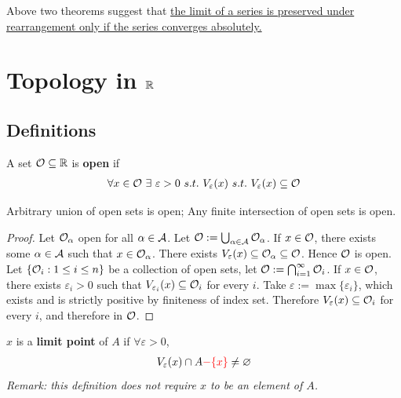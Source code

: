 \documentclass[11pt]{article}
\begin{document}
	\begin{remark}
		Above two theorems suggest that \ul{the limit of a series is preserved under rearrangement only if the series converges absolutely.}
	\end{remark}
	
	\section{Topology in $\mathbb{R}$}
	\subsection{Definitions}
	\begin{definition}
		A set $\mathcal{{O}} \subseteq \mathbb{R}$ is \textbf{open} if
		\begin{align}
			\forall x \in \mc{O}\ \exists\ \varepsilon > 0\ s.t.\ V_\varepsilon(x)\ s.t.\ V_\varepsilon(x) \subseteq \mc{O}
		\end{align}
	\end{definition}
	
	\begin{theorem}
		Arbitrary union of open sets is open; Any finite intersection of open sets is open.
	\end{theorem}
	
	\begin{proof}
		Let $\mathcal{{O}}_\alpha$ open for all $\alpha \in \mathcal{{A}}$. Let $\mathcal{{O}} := \bigcup_{\alpha \in \mathcal{{A}}} \mathcal{{O}}_\alpha$. If $x \in \mathcal{{O}}$, there exists some $\alpha \in \mathcal{{A}}$ such that $x \in \mathcal{{O}}_\alpha$. There exists $V_\varepsilon(x) \subseteq \mathcal{{O}}_{\alpha} \subseteq \mathcal{{O}}$. Hence $\mathcal{{O}}$ is open.
		\\
		Let $\{\mathcal{{O}}_i: 1 \leq i \leq n\}$ be a collection of open sets, let $\mathcal{{O}} := \bigcap_{i=1}^\infty \mathcal{{O}}_i$. If $x \in \mathcal{{O}}$, there exists $\varepsilon_i > 0$ such that $V_{\varepsilon_i}(x) \subseteq \mathcal{{O}}_i$ for every $i$. Take $\varepsilon := \max\{\varepsilon_i\}$, which exists and is strictly positive by finiteness of index set. Therefore $V_\varepsilon(x) \subseteq \mathcal{{O}}_i$ for every $i$, and therefore in $\mathcal{{O}}$.
	\end{proof}
	
	\begin{definition}
		$x$ is a \textbf{limit point} of $A$ if $\forall \varepsilon > 0$,
		\begin{align}
			V_\varepsilon(x) \cap A \textcolor{red}{- \{x\}} \neq \varnothing
		\end{align}
		\emph{Remark: this definition does not require $x$ to be an element of $A$.}
	\end{definition}
	
\end{document}
